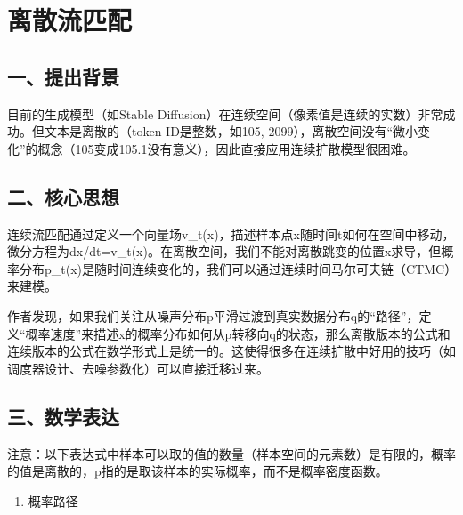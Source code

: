 \setcounter{section}{1}

\hypertarget{ux79bbux6563ux6d41ux5339ux914d}{%
\section{离散流匹配}\label{ux79bbux6563ux6d41ux5339ux914d}}

\hypertarget{ux4e00ux63d0ux51faux80ccux666f-3}{%
\subsection{一、提出背景}\label{ux4e00ux63d0ux51faux80ccux666f-3}}

目前的生成模型（如Stable Diffusion）在连续空间（像素值是连续的实数）非常成功。但文本是离散的（token ID是整数，如105, 2099），离散空间没有``微小变化''的概念（105变成105.1没有意义），因此直接应用连续扩散模型很困难。

\hypertarget{ux4e8cux6838ux5fc3ux601dux60f3-3}{%
\subsection{二、核心思想}\label{ux4e8cux6838ux5fc3ux601dux60f3-3}}

连续流匹配通过定义一个向量场v\_t(x)，描述样本点x随时间t如何在空间中移动，微分方程为dx/dt=v\_t(x)。在离散空间，我们不能对离散跳变的位置x求导，但概率分布p\_t(x)是随时间连续变化的，我们可以通过连续时间马尔可夫链（CTMC）来建模。

作者发现，如果我们关注从噪声分布p平滑过渡到真实数据分布q的``路径''，定义``概率速度''来描述x的概率分布如何从p转移向q的状态，那么离散版本的公式和连续版本的公式在数学形式上是统一的。这使得很多在连续扩散中好用的技巧（如调度器设计、去噪参数化）可以直接迁移过来。

\hypertarget{ux4e09ux6570ux5b66ux8868ux8fbe-3}{%
\subsection{三、数学表达}\label{ux4e09ux6570ux5b66ux8868ux8fbe-3}}

注意：以下表达式中样本可以取的值的数量（样本空间的元素数）是有限的，概率的值是离散的，p指的是取该样本的实际概率，而不是概率密度函数。

\begin{enumerate}
\def\labelenumi{\arabic{enumi}.}
\tightlist
\item
  概率路径
\end{enumerate}

